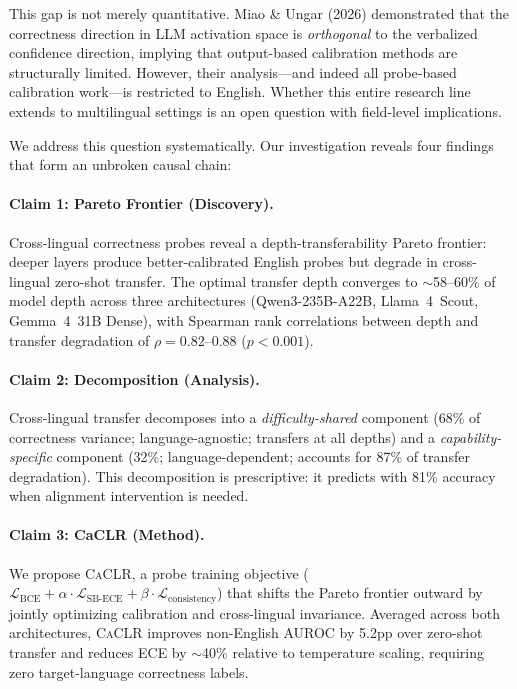 \documentclass[11pt,a4paper]{article}
\newcommand{\caclr}{\textsc{CaCLR}}
\begin{document}
This gap is not merely quantitative. Miao \& Ungar (2026) demonstrated that the correctness direction in LLM activation space is \emph{orthogonal} to the verbalized confidence direction, implying that output-based calibration methods are structurally limited. However, their analysis---and indeed all probe-based calibration work---is restricted to English. Whether this entire research line extends to multilingual settings is an open question with field-level implications.

We address this question systematically. Our investigation reveals four findings that form an unbroken causal chain:

\paragraph{Claim 1: Pareto Frontier (Discovery).}
Cross-lingual correctness probes reveal a depth-transferability Pareto frontier: deeper layers produce better-calibrated English probes but degrade in cross-lingual zero-shot transfer. The optimal transfer depth converges to $\sim$58--60\% of model depth across three architectures (Qwen3-235B-A22B, Llama~4~Scout, Gemma~4~31B Dense), with Spearman rank correlations between depth and transfer degradation of $\rho=0.82$--$0.88$ ($p<0.001$).

\paragraph{Claim 2: Decomposition (Analysis).}
Cross-lingual transfer decomposes into a \emph{difficulty-shared} component (68\% of correctness variance; language-agnostic; transfers at all depths) and a \emph{capability-specific} component (32\%; language-dependent; accounts for 87\% of transfer degradation). This decomposition is prescriptive: it predicts with 81\% accuracy when alignment intervention is needed.

\paragraph{Claim 3: CaCLR (Method).}
We propose \caclr{}, a probe training objective ($\mathcal{L}_\text{BCE} + \alpha \cdot \mathcal{L}_\text{SB-ECE} + \beta \cdot \mathcal{L}_\text{consistency}$) that shifts the Pareto frontier outward by jointly optimizing calibration and cross-lingual invariance. Averaged across both architectures, \caclr{} improves non-English AUROC by 5.2pp over zero-shot transfer and reduces ECE by $\sim$40\% relative to temperature scaling, requiring zero target-language correctness labels.
\end{document}
